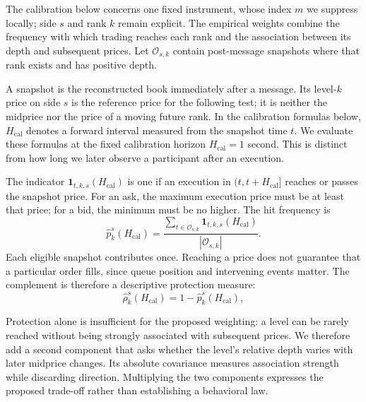 The calibration below concerns one fixed instrument, whose index $m$ we suppress locally; side $s$ and rank $k$ remain explicit. The empirical weights combine the frequency with which trading reaches each rank and the association between its depth and subsequent prices. Let $\mathcal O_{s,k}$ contain post-message snapshots where that rank exists and has positive depth.
\begin{review}
A snapshot is the reconstructed book immediately after a message. Its level-$k$ price on side $s$ is the reference price for the following test; it is neither the midprice nor the price of a moving future rank. In the calibration formulas below, $H_{\mathrm{cal}}$ denotes a forward interval measured from the snapshot time $t$. We evaluate these formulas at the fixed calibration horizon $H_{\mathrm{cal}}=1$ second. This is distinct from how long we later observe a participant after an execution.
\end{review}
The indicator $\mathbf{1}_{t,k,s}(H_{\mathrm{cal}})$ is one if an execution in $(t,t+H_{\mathrm{cal}}]$ reaches or passes the snapshot price. For an ask, the maximum execution price must be at least that price; for a bid, the minimum must be no higher. The hit frequency is
\begin{equation}
    \widehat p^{s}_{k}(H_{\mathrm{cal}})
    =
    \frac{
        \sum_{t\in\mathcal{O}_{s,k}}\mathbf{1}_{t,k,s}(H_{\mathrm{cal}})
    }{
        |\mathcal{O}_{s,k}|
    }.
    \label{eq:empirical_hit_probability}
\end{equation}
Each eligible snapshot contributes once. Reaching a price does not guarantee that a particular order fills, since queue position and intervening events matter. The complement is therefore a descriptive protection measure:
\begin{equation}
    \widehat\rho^{s}_{k}(H_{\mathrm{cal}})=1-\widehat p^{s}_{k}(H_{\mathrm{cal}}),
    \label{eq:empirical_protection_profile}
\end{equation}
\begin{review}
Protection alone is insufficient for the proposed weighting: a level can be rarely reached without being strongly associated with subsequent prices. We therefore add a second component that asks whether the level's relative depth varies with later midprice changes. Its absolute covariance measures association strength while discarding direction. Multiplying the two components expresses the proposed trade-off rather than establishing a behavioral law.
\end{review}
